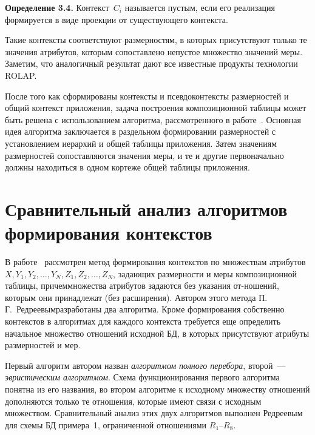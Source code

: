 \begin{multicols}{2}
  \smallskip
  
  \noindent
  \textbf{Определение 3.4.} Контекст~$C_i$ называется пустым, если его 
реализация формируется в виде проекции от существующего контекста.
  
  Такие контексты соответствуют размерностям, в которых присутствуют 
только те значения атрибутов, которым сопоставлено непустое множество 
значений меры. Заметим, что аналогичный результат дают все известные 
продукты технологии ROLAP.
  
  \smallskip
  После того как сформированы контексты и псевдоконтексты размерностей и 
общий контекст приложения, задача построения композиционной таблицы 
может быть решена с использованием алгоритма, рассмотренного в 
работе~\cite{19-z}. Основная идея алгоритма заключается в раздельном 
формировании размерностей с установлением иерархий и общей таблицы 
приложения. Затем значениям размерностей сопоставляются значения меры, и 
те и другие первоначально должны находиться в одном кортеже общей 
таблицы приложения.
  
\section{Сравнительный анализ алгоритмов формирования 
контекстов}
  
  В работе~\cite{20-z} рассмотрен метод формирования контекстов по 
множествам атрибутов $X, Y_1, Y_2, \ldots , Y_N, Z_1, Z_2, \ldots , Z_N$, задающих 
размерности и меры композиционной таблицы, причем\linebreak множества атрибутов 
задаются без указания от-\linebreak ношений, которым они принадлежат (без рас\-ширения). 
Автором этого метода П.\,Г.~Редреевым\linebreak разработаны два алгоритма. Кроме 
формирования собственно контекстов в алгоритмах для каж\-до\-го контекста 
требуется еще определить начальное множество отношений исходной БД, в 
которых присутствуют атрибуты размерностей и мер.
  
Первый алгоритм автором назван \textit{алгоритмом полного перебора}, 
второй~--- \textit{эвристическим алгоритмом}. Схема функционирования 
первого алгоритма понятна из его названия, во втором алгоритме к исходному 
множеству отношений дополняются только те отношения, которые имеют 
связи с исходным множеством. Сравнительный анализ этих двух алгоритмов 
выполнен Редреевым для схемы БД примера~1, ограниченной 
отношениями $R_1$--$R_8$.


\end{multicols}
